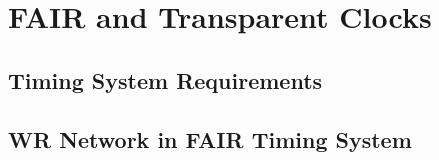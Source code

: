 \section{FAIR and Transparent Clocks}
\label{sec:FAIR}


\subsection{Timing System Requirements}



\subsection{WR Network in FAIR Timing System}
